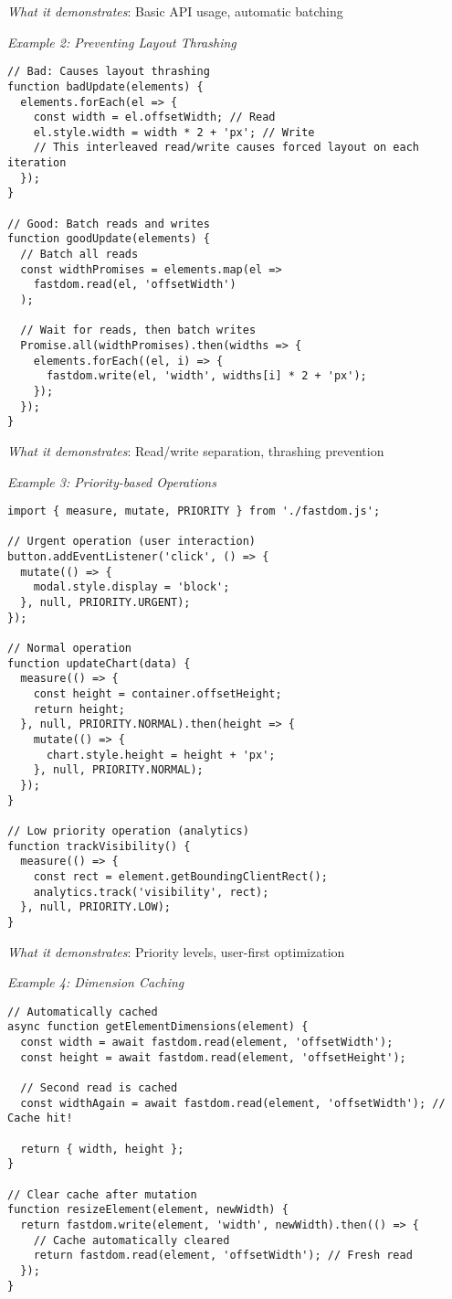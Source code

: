 \documentclass[11pt]{article}
\begin{document}
\emph{What it demonstrates}: Basic API usage, automatic batching

\emph{Example 2: Preventing Layout Thrashing}

\begin{verbatim}
// Bad: Causes layout thrashing
function badUpdate(elements) {
  elements.forEach(el => {
    const width = el.offsetWidth; // Read
    el.style.width = width * 2 + 'px'; // Write
    // This interleaved read/write causes forced layout on each iteration
  });
}

// Good: Batch reads and writes
function goodUpdate(elements) {
  // Batch all reads
  const widthPromises = elements.map(el => 
    fastdom.read(el, 'offsetWidth')
  );
  
  // Wait for reads, then batch writes
  Promise.all(widthPromises).then(widths => {
    elements.forEach((el, i) => {
      fastdom.write(el, 'width', widths[i] * 2 + 'px');
    });
  });
}
\end{verbatim}

\emph{What it demonstrates}: Read/write separation, thrashing prevention

\emph{Example 3: Priority-based Operations}

\begin{verbatim}
import { measure, mutate, PRIORITY } from './fastdom.js';

// Urgent operation (user interaction)
button.addEventListener('click', () => {
  mutate(() => {
    modal.style.display = 'block';
  }, null, PRIORITY.URGENT);
});

// Normal operation
function updateChart(data) {
  measure(() => {
    const height = container.offsetHeight;
    return height;
  }, null, PRIORITY.NORMAL).then(height => {
    mutate(() => {
      chart.style.height = height + 'px';
    }, null, PRIORITY.NORMAL);
  });
}

// Low priority operation (analytics)
function trackVisibility() {
  measure(() => {
    const rect = element.getBoundingClientRect();
    analytics.track('visibility', rect);
  }, null, PRIORITY.LOW);
}
\end{verbatim}

\emph{What it demonstrates}: Priority levels, user-first optimization

\emph{Example 4: Dimension Caching}

\begin{verbatim}
// Automatically cached
async function getElementDimensions(element) {
  const width = await fastdom.read(element, 'offsetWidth');
  const height = await fastdom.read(element, 'offsetHeight');
  
  // Second read is cached
  const widthAgain = await fastdom.read(element, 'offsetWidth'); // Cache hit!
  
  return { width, height };
}

// Clear cache after mutation
function resizeElement(element, newWidth) {
  return fastdom.write(element, 'width', newWidth).then(() => {
    // Cache automatically cleared
    return fastdom.read(element, 'offsetWidth'); // Fresh read
  });
}
\end{verbatim}
\end{document}
